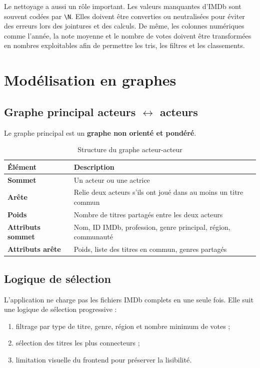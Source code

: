 \documentclass[a4paper,12pt]{article}
\newcommand{\code}[1]{\texttt{\small\color{imdbslate}#1}}
\begin{document}
Le nettoyage a aussi un rôle important. Les valeurs manquantes d'IMDb sont souvent codées par \code{\textbackslash N}. Elles doivent être converties ou neutralisées pour éviter des erreurs lors des jointures et des calculs. De même, les colonnes numériques comme l'année, la note moyenne et le nombre de votes doivent être transformées en nombres exploitables afin de permettre les tris, les filtres et les classements.

\section{Modélisation en graphes}

\subsection{Graphe principal acteurs $\leftrightarrow$ acteurs}

Le graphe principal est un \textbf{graphe non orienté et pondéré}.

\begin{table}[H]
\centering
\small
\begin{tabularx}{0.9\linewidth}{>{\bfseries}l X}
\toprule
\rowcolor{imdblight}
Élément & Description \\
\midrule
Sommet & Un acteur ou une actrice \\
Arête & Relie deux acteurs s'ils ont joué dans au moins un titre commun \\
Poids & Nombre de titres partagés entre les deux acteurs \\
\midrule
Attributs sommet & Nom, ID IMDb, profession, genre principal, région, communauté \\
Attributs arête & Poids, liste des titres en commun, genres partagés \\
\bottomrule
\end{tabularx}
\caption{Structure du graphe acteur-acteur}
\end{table}

\subsection{Logique de sélection}

L'application ne charge pas les fichiers IMDb complets en une seule fois. Elle suit une logique de sélection progressive :

\begin{enumerate}[leftmargin=1.4cm, itemsep=4pt]
  \item filtrage par type de titre, genre, région et nombre minimum de votes ;
  \item sélection des titres les plus connecteurs ;
  \item limitation visuelle du frontend pour préserver la lisibilité.
\end{enumerate}
\end{document}
